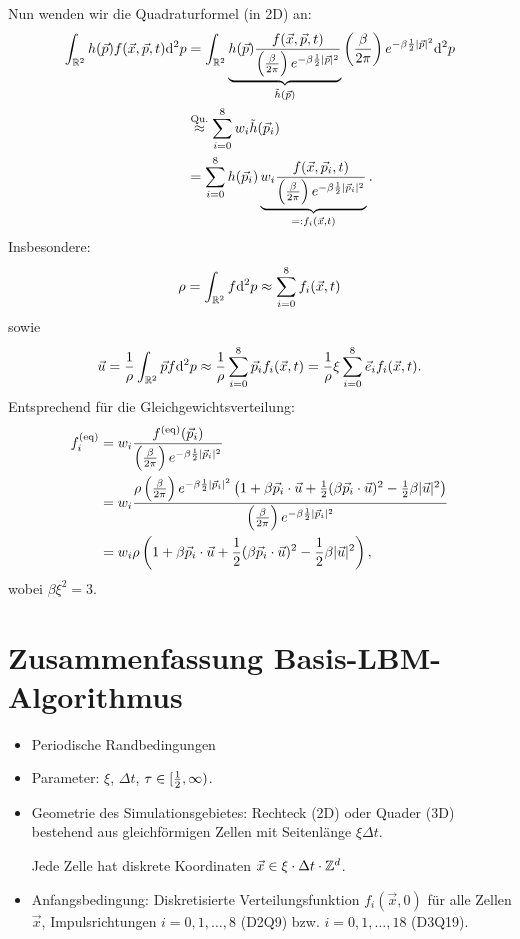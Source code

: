 Nun wenden wir die Quadraturformel (in 2D) an:
\begin{align*}
  \int_{\mathbb{R}^2} h(\vec{p}) f(\vec{x}, \vec{p}, t) \mathrm{d}^2 p
  &= \int_{\mathbb{R}^2} \underbrace{
    h(\vec{p}) \frac{f(\vec{x}, \vec{p}, t)}
    {\left( \frac{\beta}{2\pi} \right) e^{-\beta \frac{1}{2} |\vec{p}|^2}}
  }_{\tilde{h}(\vec{p})}
  \left( \frac{\beta}{2\pi} \right) e^{-\beta \frac{1}{2} |\vec{p}|^2}
    \mathrm{d}^2 p \\
  &\overset{\text{Qu.}}{\approx}
    \sum_{i=0}^8 w_i \tilde{h}(\vec{p}_i) \\
  &= \sum_{i=0}^8 h(\vec{p}_i) \underbrace{ w_i
    \frac{f(\vec{x}, \vec{p}_i, t)}
    {\left( \frac{\beta}{2\pi} \right) e^{-\beta \frac{1}{2} |\vec{p}_i|^2}}
    }_{=: f_i( \vec{x}, t )}.    
\end{align*}
Insbesondere:
\[ \rho = \int_{\mathbb{R}^2} f \mathrm{d}^2 p \approx \sum_{i=0}^8 f_i(\vec{x}, t) \]
sowie
\[ \vec{u} = \frac{1}{\rho} \int_{\mathbb{R}^2} \vec{p} f \mathrm{d}^2 p \approx
  \frac{1}{\rho} \sum_{i=0}^8 \vec{p}_i f_i(\vec{x}, t) =
  \frac{1}{\rho} \xi \sum_{i=0}^8 \vec{e}_i f_i(\vec{x}, t).
\]
Entsprechend für die Gleichgewichtsverteilung:
\begin{align*}
  f_i^{(\text{eq})}
  &= w_i \frac{f^{(\text{eq})}(\vec{p}_i)}
    {\left( \frac{\beta}{2\pi} \right) e^{-\beta \frac{1}{2} |\vec{p}_i|^2}} \\
  &= w_i \frac{\rho \left( \frac{\beta}{2\pi} \right)
    e^{-\beta \frac{1}{2} |\vec{p}_i|^2} \left( 1 + \beta \vec{p}_i \cdot \vec{u}
    + \frac{1}{2} (\beta \vec{p}_i \cdot \vec{u})^2
    - \frac{1}{2} \beta |\vec{u}|^2 \right) }
    {\left( \frac{\beta}{2\pi} \right) e^{-\beta \frac{1}{2} |\vec{p}_i|^2}} \\
  &= w_i \rho \left( 1 + \beta \vec{p}_i \cdot \vec{u}
    + \frac{1}{2} (\beta \vec{p}_i \cdot \vec{u})^2
    - \frac{1}{2} \beta |\vec{u}|^2 \right),
\end{align*}
wobei $\beta \xi^2 = 3$.

\section*{Zusammenfassung Basis-LBM-Algorithmus}
\begin{itemize}
\item Periodische Randbedingungen
\item Parameter: $\xi$, $\Delta t$, $\tau \in [\frac{1}{2}, \infty)$.
\item Geometrie des Simulationsgebietes: Rechteck (2D) oder Quader (3D)
  bestehend aus gleichförmigen Zellen mit Seitenlänge $\xi \Delta t$.

  Jede Zelle hat diskrete Koordinaten $\vec{x} \in \xi \cdot \Delta t \cdot
  \mathbb{Z}^d$.
\item Anfangsbedingung: Diskretisierte Verteilungsfunktion $f_i(\vec{x}, 0)$ für
  alle Zellen $\vec{x}$, Impulsrichtungen $i = 0, 1, \ldots, 8$ (D2Q9) bzw. $i
  = 0, 1, \ldots, 18$ (D3Q19).
\end{itemize}

